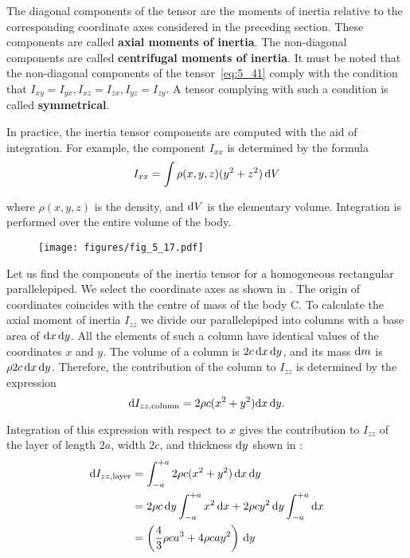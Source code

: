 \noindent
The diagonal components of the tensor are the moments of inertia relative to the corresponding coordinate axes considered in the preceding section. These components are called \textbf{axial moments of inertia}. The non-diagonal components are called \textbf{centrifugal moments of inertia}. It must be noted that the non-diagonal components of the tensor~\eqref{eq:5_41} comply with the condition that $I_{xy}=I_{yx}, I_{xz}=I_{zx}, I_{yz}=I_{zy}$. A tensor complying with such a condition is called \textbf{symmetrical}.

In practice, the inertia tensor components are computed with the aid of integration. For example, the component $I_{xx}$ is determined by the formula
\begin{equation*}
	I_{xx} = \int \rho(x,y,z)(y^2+z^2)\,\mathrm{d} V
\end{equation*}

\noindent
where $\rho(x,y,z)$ is the density, and $\mathrm{d} V$ is the elementary volume. Integration is performed over the entire volume of the body.

\begin{figure}[t]
	\begin{center}
		\texttt{[image: figures/fig\_5\_17.pdf]}
		\caption[]{}
		\label{fig:5_17}
	\end{center}
\vspace{-1.0cm}
\end{figure}

Let us find the components of the inertia tensor for a homogeneous rectangular parallelepiped. We select the coordinate axes as shown in . The origin of coordinates coincides with the centre of mass of the body C. To calculate the axial moment of inertia $I_{zz}$ we divide our parallelepiped into columns with a base area of $\mathrm{d} x\,\mathrm{d} y$. All the elements of such a column have identical values of the coordinates $x$ and $y$. The volume of a column is $2c\,\mathrm{d} x\,\mathrm{d} y$, and its mass $\mathrm{d} m$ is $\rho 2c\,\mathrm{d} x\,\mathrm{d} y$. Therefore, the contribution of the column to $I_{zz}$ is determined by the expression
\begin{equation*}
\mathrm{d} I_{zz,\text{column}} = 2\rho c(x^2+y^2)\mathrm{d} x\,\mathrm{d} y.
\end{equation*}

\noindent
Integration of this expression with respect to $x$ gives the contribution to $I_{zz}$ of the layer of length $2a$, width $2c$, and thickness $\mathrm{d} y$ shown in :
\begin{align}
\mathrm{d} I_{zz,\text{layer}} &= \int_{-a}^{+a} 2\rho c(x^2+y^2)\,\mathrm{d} x\,\mathrm{d} y\nonumber\\
&= 2\rho c\,\mathrm{d} y\int_{-a}^{+a} x^2\,\mathrm{d} x + 2\rho cy^2\,\mathrm{d} y\int_{-a}^{+a}\mathrm{d} x \nonumber\\
&= \left(\frac{4}{3}\rho ca^3 + 4\rho cay^2\right)\,\mathrm{d} y\label{eq:5_42}
\end{align}

